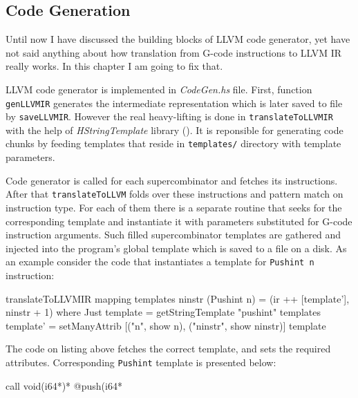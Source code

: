 \documentclass[12pt,a4paper]{report}
\begin{document}
\subsection{Code Generation}
Until now I have discussed the building blocks of LLVM code generator, yet
have not said anything about how translation from G-code instructions to LLVM IR
really works. In this chapter I am going to fix that.

LLVM code generator is implemented in \textit{CodeGen.hs} file. First, function
\texttt{genLLVMIR} generates the intermediate representation which is later
saved to file by \texttt{saveLLVMIR}. However the real heavy-lifting is done in
\texttt{translateToLLVMIR} with the help of \textit{HStringTemplate} library
(\cite{website:hstring_template}). It is reponsible for generating code chunks
by feeding templates that reside in \texttt{templates/} directory with template
parameters.

Code generator is called for each supercombinator and fetches its instructions.
After that \texttt{translateToLLVM} folds over these instructions and pattern
match on instruction type. For each of them there is a separate routine that
seeks for the corresponding template and instantiate it with parameters
substituted for G-code instruction arguments. Such filled supercombinator
templates are gathered and injected into the program's global template which is
saved to a file on a disk. As an example consider the code that instantiates a
template for \texttt{Pushint n} instruction:

\vspace*{0.2in}
\begin{code}[style=haskell]
  translateToLLVMIR mapping templates ninstr (Pushint n) =
      (ir ++ [template'], ninstr + 1)
      where
          Just template = getStringTemplate "pushint" templates
          template' = setManyAttrib
                  [("n", show n), ("ninstr", show ninstr)]
                  template
\end{code}

The code on listing above fetches the correct template, and sets the required
attributes. Corresponding \texttt{Pushint} template is presented below:

\vspace*{0.2in}
\begin{code}[style=assembler]
  call void(i64*)* @push(i64* %
\end{code}
\end{document}
